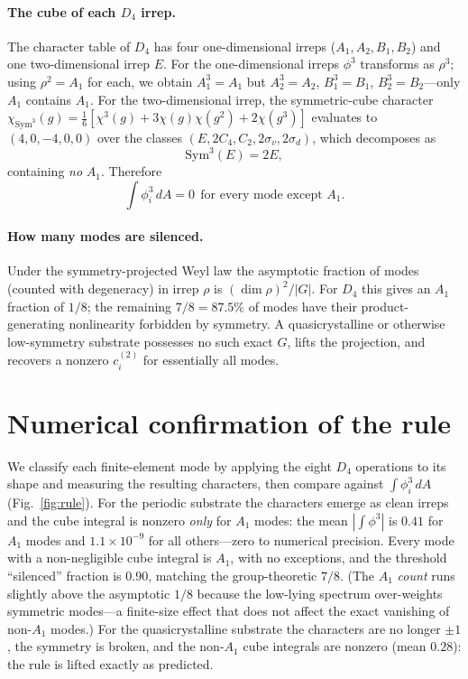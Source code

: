 \documentclass[aps,prapplied,reprint,amsmath,amssymb,floatfix]{revtex4-2}
\begin{document}
\paragraph{The cube of each $D_4$ irrep.}
The character table of $D_4$ has four one-dimensional irreps
($A_1,A_2,B_1,B_2$) and one two-dimensional irrep $E$. For the one-dimensional
irreps $\phi^3$ transforms as $\rho^3$; using $\rho^2=A_1$ for each, we obtain
$A_1^3=A_1$ but $A_2^3=A_2$, $B_1^3=B_1$, $B_2^3=B_2$---only $A_1$ contains
$A_1$. For the two-dimensional irrep, the symmetric-cube character
$\chi_{\mathrm{Sym}^3}(g)=\tfrac16[\chi^3(g)+3\chi(g)\chi(g^2)+2\chi(g^3)]$
evaluates to $(4,0,-4,0,0)$ over the classes $(E,2C_4,C_2,2\sigma_v,2\sigma_d)$,
which decomposes as
\begin{equation}
\mathrm{Sym}^3(E)=2E,
\end{equation}
containing \emph{no} $A_1$. Therefore
\begin{equation}
\boxed{\;\int\phi_i^3\,dA=0\ \ \text{for every mode except }A_1.\;}
\label{eq:rule}
\end{equation}

\paragraph{How many modes are silenced.}
Under the symmetry-projected Weyl law the asymptotic fraction of modes (counted
with degeneracy) in irrep $\rho$ is $(\dim\rho)^2/|G|$. For $D_4$ this gives an
$A_1$ fraction of $1/8$; the remaining $7/8=87.5\%$ of modes have their
product-generating nonlinearity forbidden by symmetry. A quasicrystalline or
otherwise low-symmetry substrate possesses no such exact $G$, lifts the
projection, and recovers a nonzero $c^{(2)}_i$ for essentially all modes.

\section{Numerical confirmation of the rule}

We classify each finite-element mode by applying the eight $D_4$ operations to
its shape and measuring the resulting characters, then compare against
$\int\phi_i^3\,dA$ (Fig.~\ref{fig:rule}). For the periodic substrate the
characters emerge as clean irreps and the cube integral is nonzero
\emph{only} for $A_1$ modes: the mean $|\int\phi^3|$ is $0.41$ for $A_1$ modes
and $1.1\times10^{-9}$ for all others---zero to numerical precision. Every mode
with a non-negligible cube integral is $A_1$, with no exceptions, and the
threshold ``silenced'' fraction is $0.90$, matching the group-theoretic $7/8$.
(The $A_1$ \emph{count} runs slightly above the asymptotic $1/8$ because the
low-lying spectrum over-weights symmetric modes---a finite-size effect that
does not affect the exact vanishing of non-$A_1$ modes.) For the
quasicrystalline substrate the characters are no longer $\pm1$, the symmetry is
broken, and the non-$A_1$ cube integrals are nonzero (mean $0.28$): the rule is
lifted exactly as predicted.
\end{document}

